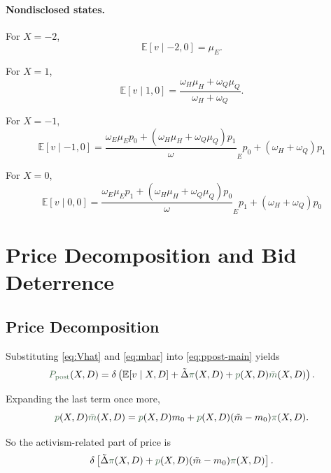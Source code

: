 \documentclass[11pt,a4paper]{article}
\theoremstyle{definition}
\theoremstyle{plain}
\theoremstyle{remark}
\newcommand{\E}{\mathbb{E}}
\newcommand{\1}{\mathbf{1}}
\newcommand{\outcome}[1]{{\color{ForestGreen!50!black}#1}}
\begin{document}
\paragraph{Nondisclosed states.}
For $X=-2$,
\begin{equation}
\E[v\mid -2,0]=\mu_E.
\label{eq:Ev-m20}
\end{equation}

For $X=1$,
\begin{equation}
\E[v\mid 1,0]
=
\frac{\omega_H \mu_H + \omega_Q \mu_Q}{\omega_H+\omega_Q}.
\label{eq:Ev-10}
\end{equation}

For $X=-1$,
\begin{equation}
\E[v\mid -1,0]
=
\frac{\omega_E \mu_E p_0 + (\omega_H \mu_H+\omega_Q \mu_Q)p_1}
\omega_E p_0 + (\omega_H+\omega_Q)p_1
\label{eq:Ev-m10}
\end{equation}

For $X=0$,
\begin{equation}
\E[v\mid 0,0]
=
\frac{\omega_E \mu_E p_1 + (\omega_H \mu_H+\omega_Q \mu_Q)p_0}
\omega_E p_1 + (\omega_H+\omega_Q)p_0
\label{eq:Ev-00}
\end{equation}

\section{Price Decomposition and Bid Deterrence}

\subsection{Price Decomposition}

Substituting \eqref{eq:Vhat} and \eqref{eq:mbar} into \eqref{eq:ppost-main} yields
\begin{equation}
\outcome{P_{\textup{post}}}(X,D)
=
\delta\left(
\E[v\mid X,D]
+
\tilde{\Delta}\outcome{\pi}(X,D)
+
\outcome{p}(X,D)\outcome{\bar m}(X,D)
\right).
\label{eq:price-decomp}
\end{equation}

Expanding the last term once more,
\begin{equation}
\outcome{p}(X,D)\outcome{\bar m}(X,D)
=
\outcome{p}(X,D)m_0
+
\outcome{p}(X,D)(\tilde m-m_0)\outcome{\pi}(X,D).
\label{eq:price-decomp-prem}
\end{equation}

So the activism-related part of price is
\begin{equation}
\delta\left[
\tilde{\Delta}\outcome{\pi}(X,D)
+
\outcome{p}(X,D)(\tilde m-m_0)\outcome{\pi}(X,D)
\right].
\label{eq:activism-price-component}
\end{equation}
\end{document}

